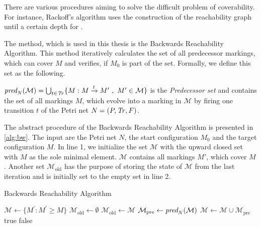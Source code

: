 \par
There are various procedures aiming to solve the difficult problem of coverability. For instance, Rackoff's algorithm uses the construction of the reachability graph until a certain depth for . 
\par
The method, which is used in this thesis is the Backwards Reachability Algorithm. This method iteratively calculates the set of all predecessor markings, which can cover $M$ and verifies, if $M_{0}$ is part of the set. Formally, we define this set as the following.
\begin{definition}\label{def:ppre}
$\operatorname{\textit{pred}}_{N}(\mathcal{M}) = \bigcup_{t \in \mathit{Tr}} \{M : M \xrightarrow{t} M' \ , \ M' \in \mathcal{M} \}$ is the \emph{Predecessor set} and contains the set of all markings $M$, which evolve into a marking in $\mathcal{M}$ by firing one transition $t$ of the Petri net $N = (P,\mathit{Tr},F)$.
\end{definition}
\par 
The abstract procedure of the Backwards Reachability Algorithm is presented in \autoref{alg:bw}. The input are the Petri net $N$, the start configuration $M_{0}$ and the target configuration $M$. In line 1, we initialize the set $\mathcal{M}$ with the upward closed set with $M$ as the sole minimal element. $\mathcal{M}$ contains all markings $M'$, which cover $M$. Another set $\mathcal{M}_{\text{old}}$ has the purpose of storing the state of $\mathcal{M}$ from the last iteration and is initially set to the empty set in line 2.

\begin{algorithm}[htb]
\caption{Backwards Reachability Algorithm}\label{alg:bw}
\begin{algorithmic}[1]
\State $\mathcal{M} \gets \{ M^{'} : M^{'} \ge M \}$
\State $\mathcal{M}_{\text{old}} \gets \emptyset$
	\State $\mathcal{M}_{\text{old}} \gets \mathcal{M}$
	\State $\mathcal{M}_{\text{pre}} \gets \operatorname{\textit{pred}}_{N}(\mathcal{M})$
	\State $\mathcal{M} \gets \mathcal{M}  \cup \mathcal{M}_{\text{pre}}$
	\Return true
\EndIf
{}
    \Return false
\EndIf
\EndWhile
\end{algorithmic}
\end{algorithm}

